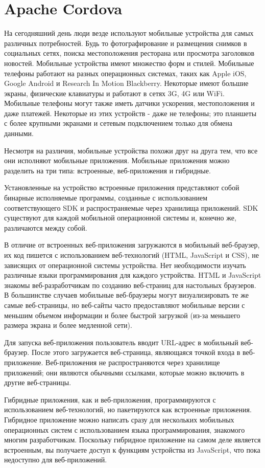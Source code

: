 \section{Apache Cordova}
На сегодняшний день люди везде используют мобильные устройства для самых различных потребностей. Будь то фотографирование и размещения снимков в социальных сетях, поиска местоположения ресторана или просмотра заголовков новостей. Мобильные устройства имеют множество форм и стилей. Мобильные телефоны работают на разных операционных системах, таких как Apple iOS, Google Android и Research In Motion Blackberry. Некоторые имеют большие экраны, физические клавиатуры и работают в сетях 3G, 4G или WiFi. Мобильные телефоны могут также иметь датчики ускорения, местоположения и даже платежей. Некоторые из этих устройств - даже не телефоны; это планшеты с более крупными экранами и сетевым подключением только для обмена данными.

Несмотря на различия, мобильные устройства похожи друг на друга тем, что все они исполняют мобильные приложения. Мобильные приложения можно разделить на три типа: встроенные, веб-приложения и гибридные.

Установленные на устройство встроенные приложения представляют собой бинарные исполняемые программы, созданные с использованием соответствующего  SDK  и  распространяемые  через  хранилища приложений. SDK существуют для каждой мобильной операционной системы и, конечно же, различаются между собой.

В отличие от встроенных веб-приложения загружаются в мобильный веб-браузер, их код пишется с использованием веб-технологий (HTML, JavaScript и CSS), не зависящих от операционной системы устройства. Нет необходимости изучать различные языки программирования для каждого устройства. HTML и JavaScript знакомы веб-разработчикам по созданию веб-страниц для настольных браузеров. В большинстве случаев мобильные веб-браузеры могут визуализировать те же самые веб-страницы, но веб-сайты часто предоставляют мобильные версии с меньшим объемом информации и более быстрой загрузкой (из-за меньшего размера экрана и более медленной сети).

Для запуска веб-приложения пользователь вводит URL-адрес в мобильный веб-браузер. После этого загружается веб-страница, являющаяся точкой входа в веб-приложение. Веб-приложения не распространяются через хранилище приложений; они являются обычными ссылками, которые можно включить в другие веб-страницы.

Гибридные приложения, как и веб-приложения, программируются с использованием веб-технологий, но пакетируются как встроенные приложения. Гибридное приложение можно написать сразу для нескольких мобильных операционных систем с использованием языка программирования, знакомого многим разработчикам. Поскольку гибридное приложение на самом деле является встроенным, вы получаете доступ к функциям устройства из JavaScript, что пока недоступно для веб-приложений.

